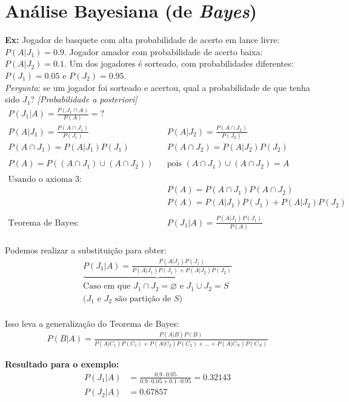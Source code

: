 \documentclass{article}
\renewcommand\bf[1]{\textbf{#1}}
\renewcommand\it[1]{\textit{#1}}
\newcommand{\vn}{\varnothing}
\begin{document}
\section{Análise Bayesiana (de \it{Bayes})}
\bf{Ex:} Jogador de basquete com alta probabilidade de acerto em lance livre: $P(A|J_1) = 0.9$.
Jogador amador com probabilidade de acerto baixa: $P(A|J_2) = 0.1$. Um dos jogadores é sorteado,
com probabilidades diferentes: $P(J_1) = 0.05$ e $P(J_2) = 0.95$.
\\
\it{Pergunta}: se um jogador foi sorteado e acertou, qual a probabilidade de que tenha sido
$J_1$? \it{[Probabilidade a posteriori]}
\begin{align*}
    P(J_1|A) = \frac{P(J_1 \cap A)}{P(A)} =? && \\
    P(A|J_1) = \frac{P(A \cap J_1)}{P(J_1)} && P(A|J_2) = \frac{P(A \cap J_2)}{P(J_2)} \\
    P(A \cap J_1) = P(A|J_1)P(J_1) &&  P(A \cap J_2) = P(A|J_2)P(J_2) \\
    \\
    P(A) =  P((A \cap J_1) \cup (A \cap J_2)) && \text{pois } (A \cap J_1) \cup (A \cap J_2) = A \\
    \\
    \text{Usando o axioma 3:} && \\
        && P(A) = P(A \cap J_1) P(A \cap J_2) \\
        && P(A) = P(A|J_1)P(J_1) + P(A|J_2)P(J_2) \\
    \\
    \text{Teorema de Bayes:}&&{P(J_1|A) = \frac{P(A|J_1)P(J_1)}{P(A)}}\\
\end{align*}

Podemos realizar a substituição para obter:
\begin{align*}
    \underbrace{P(J_1|A) = \frac{P(A|J_1)P(J_1)}{P(A|J_1)P(J_1) + P(A|J_2)P(J_2)}}\\{\text{Caso
    em que $J_1 \cap J_2 = \vn$ e $J_1 \cup J_2 = S$}} \\
    \text{($J_1$ e $J_2$ são partição de $S$)}
\end{align*}
\\[-0.5em]
Isso leva a generalização do Teorema de Bayes:
\begin{align*}
    P(B|A) = \frac{P(A|B)P(B)}{P(A|C_1)P(C_1) +P(A|C_2)P(C_2) + \ldots +P(A|C_N)P(C_N)}
\end{align*}

\bf{Resultado para o exemplo:}
\begin{align*}
    P(J_1|A) &= \frac{0.9 \cdot 0.05}{0.9 \cdot 0.05 + 0.1 \cdot 0.95} = 0.32143 \\
    P(J_2|A) &= 0.67857
\end{align*}
\\[-2em]
\end{document}
